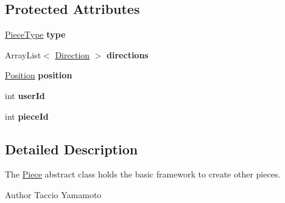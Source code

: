 \subsection*{Protected Attributes}
\begin{DoxyCompactItemize}
\item 
\hypertarget{classPiece_1_1Piece_ac7ae9a6f1d238110c310de8f727c3979}{\hyperlink{enumPiece_1_1PieceType}{Piece\-Type} {\bfseries type}}\label{classPiece_1_1Piece_ac7ae9a6f1d238110c310de8f727c3979}

\item 
\hypertarget{classPiece_1_1Piece_a59d890b78035e87d7280094dd22a0ba3}{Array\-List$<$ \hyperlink{classUtil_1_1Direction}{Direction} $>$ {\bfseries directions}}\label{classPiece_1_1Piece_a59d890b78035e87d7280094dd22a0ba3}

\item 
\hypertarget{classPiece_1_1Piece_a8b64b4574722978ddec4659c5d481777}{\hyperlink{classUtil_1_1Position}{Position} {\bfseries position}}\label{classPiece_1_1Piece_a8b64b4574722978ddec4659c5d481777}

\item 
\hypertarget{classPiece_1_1Piece_ad8cf2bb72b487efd27d3ed55ae3dee72}{int {\bfseries user\-Id}}\label{classPiece_1_1Piece_ad8cf2bb72b487efd27d3ed55ae3dee72}

\item 
\hypertarget{classPiece_1_1Piece_acb50673ffa332035abd73052511bf883}{int {\bfseries piece\-Id}}\label{classPiece_1_1Piece_acb50673ffa332035abd73052511bf883}

\end{DoxyCompactItemize}


\subsection{Detailed Description}
The \hyperlink{classPiece_1_1Piece}{Piece} abstract class holds the basic framework to create other pieces. \begin{DoxyAuthor}{Author}
Taccio Yamamoto 
\end{DoxyAuthor}


